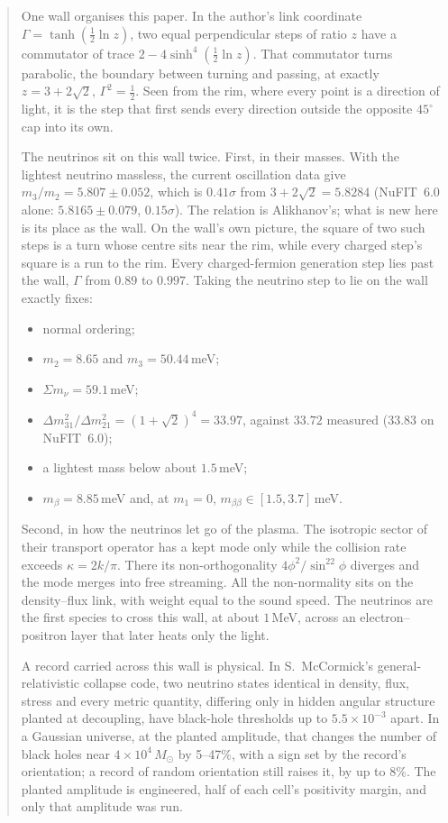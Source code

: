 \documentclass[11pt]{article}
\theoremstyle{definition}\newtheorem{hypothesis}{Hypothesis}\newtheorem{prediction}{Prediction}
\theoremstyle{remark}\newtheorem{remark}[theorem]{Remark}
\begin{document}
\begin{abstract}
One wall organises this paper. In the author's link coordinate $\Gamma=\tanh(\tfrac12\ln z)$, two equal perpendicular steps of ratio $z$ have a commutator of trace $2-4\sinh^4(\tfrac12\ln z)$. That commutator turns parabolic, the boundary between turning and passing, at exactly $z=3+2\sqrt2$, $\Gamma^2=\tfrac12$. Seen from the rim, where every point is a direction of light, it is the step that first sends every direction outside the opposite $45^\circ$ cap into its own.

The neutrinos sit on this wall twice. First, in their masses. With the lightest neutrino massless, the current oscillation data give $m_3/m_2=5.807\pm0.052$, which is $0.41\sigma$ from $3+2\sqrt2=5.8284$ (NuFIT~6.0 alone: $5.8165\pm0.079$, $0.15\sigma$). The relation is Alikhanov's; what is new here is its place as the wall. On the wall's own picture, the square of two such steps is a turn whose centre sits near the rim, while every charged step's square is a run to the rim. Every charged-fermion generation step lies past the wall, $\Gamma$ from $0.89$ to $0.997$. Taking the neutrino step to lie on the wall exactly fixes:
\begin{itemize}[nosep]
\item normal ordering;
\item $m_2=8.65$ and $m_3=50.44$\,meV;
\item $\Sigma m_\nu=59.1$\,meV;
\item $\Delta m^2_{31}/\Delta m^2_{21}=(1+\sqrt2)^4=33.97$, against $33.72$ measured ($33.83$ on NuFIT~6.0);
\item a lightest mass below about $1.5$\,meV;
\item $m_\beta=8.85$\,meV and, at $m_1=0$, $m_{\beta\beta}\in[1.5,3.7]$\,meV.
\end{itemize}

Second, in how the neutrinos let go of the plasma. The isotropic sector of their transport operator has a kept mode only while the collision rate exceeds $\kappa=2k/\pi$. There its non-orthogonality $4\phi^2/\sin^22\phi$ diverges and the mode merges into free streaming. All the non-normality sits on the density--flux link, with weight equal to the sound speed. The neutrinos are the first species to cross this wall, at about $1$\,MeV, across an electron--positron layer that later heats only the light.

A record carried across this wall is physical. In S.~McCormick's general-relativistic collapse code, two neutrino states identical in density, flux, stress and every metric quantity, differing only in hidden angular structure planted at decoupling, have black-hole thresholds up to $5.5\times10^{-3}$ apart. In a Gaussian universe, at the planted amplitude, that changes the number of black holes near $4\times10^4\,M_\odot$ by 5--47\%, with a sign set by the record's orientation; a record of random orientation still raises it, by up to 8\%. The planted amplitude is engineered, half of each cell's positivity margin, and only that amplitude was run.


\end{abstract}
\end{document}
